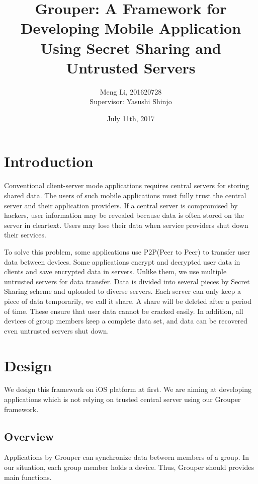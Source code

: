 \documentclass[twocolumn,10pt]{article}
\begin{document}
\date{July 11th, 2017}

\title{\bf Grouper: A Framework for Developing Mobile Application Using Secret Sharing and Untrusted Servers}

\author{
	Meng Li, 201620728  
	\\ Supervisor: Yasushi Shinjo
}

\maketitle

\section{Introduction}
Conventional client-server mode applications requires central servers for storing shared data. The users of such mobile applications must fully trust the central server and their application providers. If a central server is compromised by hackers, user information may be revealed because data is often stored on the server in cleartext. Users may lose their data when service providers shut down their services. 

To solve this problem, some applications use P2P(Peer to Peer) to transfer user data between devices. Some applications encrypt and decrypted user data in clients and save encrypted data in servers. Unlike them, we use multiple untrusted servers for data transfer. Data is divided into several pieces by Secret Sharing scheme and uploaded to diverse servers. Each server can only keep a piece of data temporarily, we call it share. A share will be deleted after a period of time. These ensure that user data cannot be cracked easily. In addition, all devices of group members keep a complete data set, and data can be recovered even untrusted servers shut down.

\section{Design}

We design this framework on iOS platform at first. We are aiming at developing applications which is not relying on trusted central server using our Grouper framework. 

\subsection{Overview}
Applications by Grouper can synchronize data between members of a group. In our situation, each group member holds a device. Thus, Grouper should provides main functions.
\end{document}
